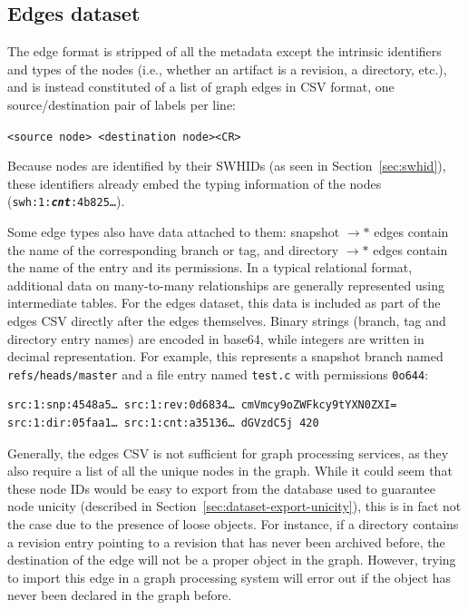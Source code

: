 \subsection{Edges dataset}
\label{sec:edges-format}
The edge format is stripped of all the metadata except the intrinsic
identifiers and types of the nodes (i.e., whether an artifact is a revision, a
directory, etc.), and is instead constituted of a list of graph edges in CSV
format, one source/destination pair of labels per line:

\texttt{<source node> <destination node><CR>}

Because nodes are identified by their \glspl{SWHID} (as seen in
Section~\ref{sec:swhid}), these identifiers already embed the typing
information of the nodes (\texttt{swh:1:\emph{\textbf{cnt}}:4b825…}).

Some edge types also have data attached to them: snapshot $\rightarrow\ast$
edges contain the name of the corresponding branch or tag, and
directory $\rightarrow\ast$ edges contain the name of the entry and its
permissions.
In a typical relational format, additional data on many-to-many relationships
are generally represented using intermediate tables. For the edges dataset,
this data is included as part of the edges CSV directly after the edges
themselves. Binary strings (branch, tag and directory entry names) are encoded
in base64, while integers are written in decimal representation. For example,
this represents a snapshot branch named \texttt{refs/heads/master} and a file
entry named \texttt{test.c} with permissions \texttt{0o644}:

\begin{verbatim}
src:1:snp:4548a5… src:1:rev:0d6834… cmVmcy9oZWFkcy9tYXN0ZXI=
src:1:dir:05faa1… src:1:cnt:a35136… dGVzdC5j 420
\end{verbatim}

Generally, the edges CSV is not sufficient for graph processing services, as
they also require a list of all the unique nodes in the graph. While it could
seem that these node IDs would be easy to export from the database used to
guarantee node unicity (described in Section~\ref{sec:dataset-export-unicity}),
this is in fact not the case due to the presence of loose objects. For
instance, if a directory contains a revision entry pointing to a revision that
has never been archived before, the destination of the edge will not be a
proper object in the graph. However, trying to import this edge in a graph
processing system will error out if the object has never been declared in the
graph before.


